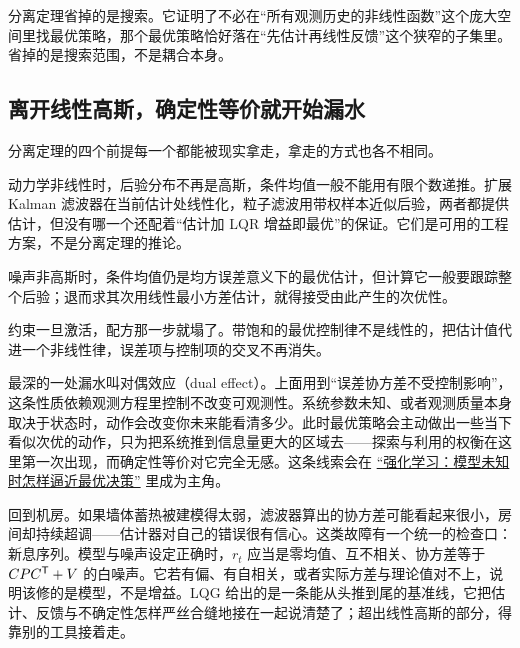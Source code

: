 分离定理省掉的是搜索。它证明了不必在``所有观测历史的非线性函数''这个庞大空间里找最优策略，那个最优策略恰好落在``先估计再线性反馈''这个狭窄的子集里。省掉的是搜索范围，不是耦合本身。

\subsection{离开线性高斯，确定性等价就开始漏水}

分离定理的四个前提每一个都能被现实拿走，拿走的方式也各不相同。

动力学非线性时，后验分布不再是高斯，条件均值一般不能用有限个数递推。扩展 Kalman 滤波器在当前估计处线性化，粒子滤波用带权样本近似后验，两者都提供估计，但没有哪一个还配着``估计加 LQR 增益即最优''的保证。它们是可用的工程方案，不是分离定理的推论。

噪声非高斯时，条件均值仍是均方误差意义下的最优估计，但计算它一般要跟踪整个后验；退而求其次用线性最小方差估计，就得接受由此产生的次优性。

约束一旦激活，配方那一步就塌了。带饱和的最优控制律不是线性的，把估计值代进一个非线性律，误差项与控制项的交叉不再消失。

最深的一处漏水叫对偶效应（dual effect）。上面用到``误差协方差不受控制影响''，这条性质依赖观测方程里控制不改变可观测性。系统参数未知、或者观测质量本身取决于状态时，动作会改变你未来能看清多少。此时最优策略会主动做出一些当下看似次优的动作，只为把系统推到信息量更大的区域去——探索与利用的权衡在这里第一次出现，而确定性等价对它完全无感。这条线索会在 \hyperref[ch:139]{``强化学习：模型未知时怎样逼近最优决策''} 里成为主角。

回到机房。如果墙体蓄热被建模得太弱，滤波器算出的协方差可能看起来很小，房间却持续超调——估计器对自己的错误很有信心。这类故障有一个统一的检查口：新息序列。模型与噪声设定正确时，\(r_t\) 应当是零均值、互不相关、协方差等于 \(CPC^{\mathsf{T}}+V\) 的白噪声。它若有偏、有自相关，或者实际方差与理论值对不上，说明该修的是模型，不是增益。LQG 给出的是一条能从头推到尾的基准线，它把估计、反馈与不确定性怎样严丝合缝地接在一起说清楚了；超出线性高斯的部分，得靠别的工具接着走。
